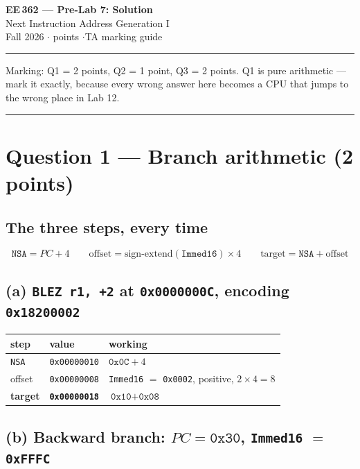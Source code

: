 \documentclass[11pt]{article}
\newcommand{\code}[1]{\texttt{#1}}
\newcommand{\hr}{\vspace{2pt}\hrule\vspace{6pt}}
\begin{document}
\begin{center}
{\Large\bfseries EE\,362 --- Pre-Lab 7: Solution}\\[2pt]
{\large Next Instruction Address Generation I}\\[4pt]
Fall 2026 \quad$\cdot$ points \quad$\cdot$\quad TA marking guide
\end{center}
\hr

{\small Marking: Q1 = 2 points, Q2 = 1 point, Q3 = 2 points. Q1 is pure
arithmetic --- mark it exactly, because every wrong answer here becomes a CPU
that jumps to the wrong place in Lab 12.}

\vspace{4pt}\hr

\section*{Question 1 --- Branch arithmetic (2 points)}

\subsection*{The three steps, every time}

\[
\code{NSA} = PC + 4
\qquad
\text{offset} = \text{sign-extend}(\code{Immed16}) \times 4
\qquad
\text{target} = \code{NSA} + \text{offset}
\]

\subsection*{(a) \code{BLEZ r1, +2} at \code{0x0000000C}, encoding \code{0x18200002}}

\begin{center}
\begin{tabular}{lll}
\toprule
step & value & working \\
\midrule
\code{NSA} & \code{0x00000010} & $\code{0x0C} + 4$ \\
offset & \code{0x00000008} & \code{Immed16} $=$ \code{0x0002}, positive, $2 \times 4 = 8$ \\
\textbf{target} & \textbf{\code{0x00000018}} & $\code{0x10} + \code{0x08}$ \\
\bottomrule
\end{tabular}
\end{center}

\subsection*{(b) Backward branch: $PC = \code{0x30}$, \code{Immed16} $=$ \code{0xFFFC}}
\end{document}
